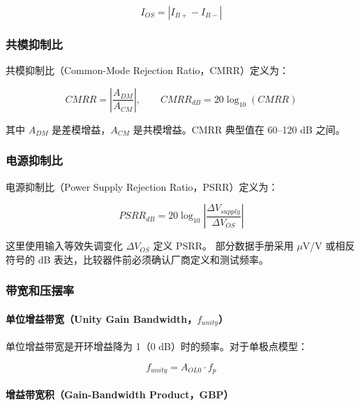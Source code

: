 \begin{equation}
I_{OS} = |I_{B+} - I_{B-}| \label{eq:input-offset-current}
\end{equation}

\subsubsection{共模抑制比}

共模抑制比（Common-Mode Rejection Ratio，CMRR）定义为：

\begin{equation}
CMRR = \left|\frac{A_{DM}}{A_{CM}}\right|, \qquad
CMRR_{dB} = 20\log_{10}(CMRR) \label{eq:cmrr}
\end{equation}

其中 $A_{DM}$ 是差模增益，$A_{CM}$ 是共模增益。CMRR 典型值在 60--120 dB 之间。

\subsubsection{电源抑制比}

电源抑制比（Power Supply Rejection Ratio，PSRR）定义为：

\begin{equation}
PSRR_{dB} = 20\log_{10}\left|\frac{\Delta V_{supply}}{\Delta V_{OS}}\right| \label{eq:psrr}
\end{equation}

这里使用输入等效失调变化 $\Delta V_{OS}$ 定义 PSRR。
部分数据手册采用 $\mu$V/V 或相反符号的 dB 表达，比较器件前必须确认厂商定义和测试频率。

\subsubsection{带宽和压摆率}

\paragraph{单位增益带宽（Unity Gain Bandwidth，$f_{unity}$）}

单位增益带宽是开环增益降为 1（0 dB）时的频率。对于单极点模型：

\begin{equation}
f_{unity} = A_{OL0} \cdot f_p \label{eq:unity-gain-bandwidth}
\end{equation}

\paragraph{增益带宽积（Gain-Bandwidth Product，GBP）}

